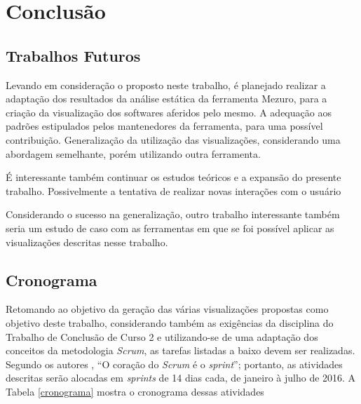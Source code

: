 \chapter[Conclusão]{Conclusão}

\section{Trabalhos Futuros}

Levando em consideração o proposto neste trabalho, é planejado realizar a
adaptação dos resultados da análise estática da ferramenta Mezuro, para a
criação da visualização dos softwares aferidos pelo mesmo. A adequação aos
padrões estipulados pelos mantenedores da ferramenta, para uma possível
contribuição. Generalização da utilização das visualizações, considerando uma
abordagem semelhante, porém utilizando outra ferramenta.

É interessante também continuar os estudos teóricos e a expansão do presente
trabalho. Possivelmente a tentativa de realizar novas interações com o usuário

Considerando o sucesso na generalização, outro trabalho interessante também
seria um estudo de caso com as ferramentas em que se foi possível aplicar as
visualizações descritas nesse trabalho.

\section{Cronograma}

Retomando ao objetivo da geração das várias visualizações propostas como
objetivo deste trabalho, considerando também as exigências da disciplina do
Trabalho de Conclusão de Curso 2 e utilizando-se de uma adaptação dos conceitos
da metodologia \textit{Scrum}, as tarefas listadas a baixo devem ser realizadas.
Segundo os autores , ``O coração do
\textit{Scrum} é o \textit{sprint}''; portanto, as atividades descritas serão
alocadas em \textit{sprints} de 14 dias cada, de janeiro à julho de 2016. A
Tabela \ref{cronograma} mostra o cronograma dessas atividades

